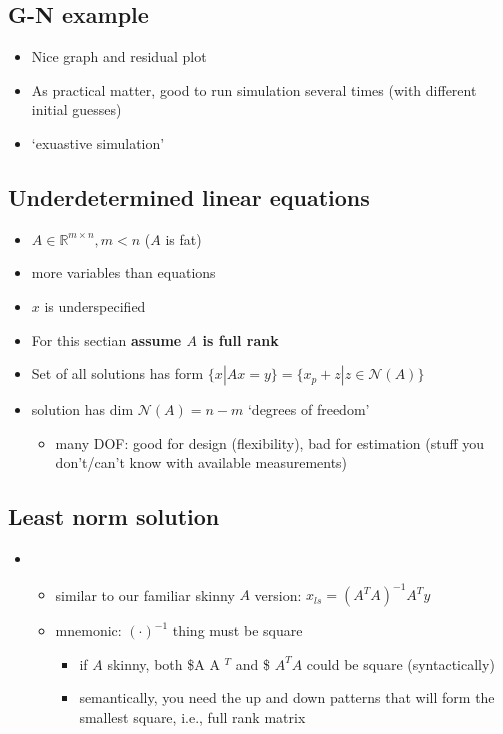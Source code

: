 \documentclass[10pt,letterpaper]{article}
\begin{document}
\subsection{G-N example}
\label{sec-6_7}

\begin{itemize}
\item Nice graph and residual plot
\item As practical matter, good to run simulation several times (with different initial guesses)
\item `exuastive simulation'
\end{itemize}
\subsection{Underdetermined linear equations}
\label{sec-6_8}

\begin{itemize}
\item $A \in \mathbb{R}^{m \times n}, m<n$ ($A$ is fat)
\item more variables than equations
\item $x$ is underspecified
\item For this sectian \textbf{assume $A$ is full rank}
\item Set of all solutions has form $\{x | Ax=y\} = \{x_p + z | z \in \mathcal{N}(A) \}$
\item solution has dim $\mathcal{N}(A)= n-m$ `degrees of freedom'

\begin{itemize}
\item many DOF: good for design (flexibility), bad for estimation (stuff you don't/can't know with available measurements)
\end{itemize}

\end{itemize}
\subsection{Least norm solution}
\label{sec-6_9}

\begin{itemize}
\item {}

\begin{itemize}
\item similar to our familiar skinny $A$ version: $x _{ls} = (A^{T} A) ^{-1} A ^{T} y$
\item mnemonic: $(\cdot) ^{-1}$ thing must be square

\begin{itemize}
\item if $A$ skinny, both \$A A $^{T}$ and \$ $A^TA$ could be square (syntactically)
\item semantically, you need the up and down patterns that will form the smallest square, i.e., full rank matrix
\end{itemize}

\end{itemize}

\end{itemize}
\end{document}

